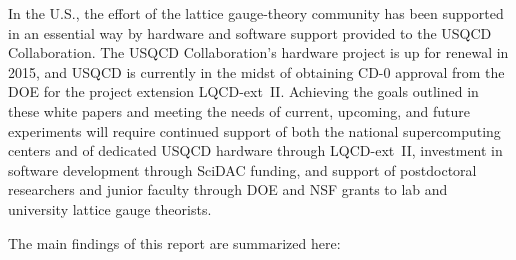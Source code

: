 In the U.S., the effort of the lattice gauge-theory community has been supported in an essential way by hardware and software support provided to the USQCD Collaboration.  The USQCD Collaboration's hardware project is up for renewal in 2015, and USQCD is currently in the midst of obtaining CD-0 approval from the DOE for the project extension LQCD-ext~II.  Achieving the goals outlined in these white papers and meeting the needs of current, upcoming, and future experiments will require continued support of both the national supercomputing centers and of dedicated USQCD hardware through LQCD-ext~II, investment in software development through SciDAC funding, and support of postdoctoral researchers and junior faculty through DOE and NSF grants to lab and university lattice gauge theorists.   

The main findings of this report are summarized here:

